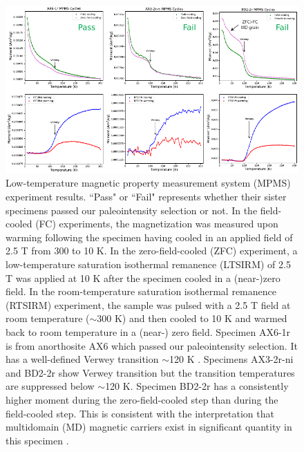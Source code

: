 \documentclass[9pt,twoside]{pnas-new}
\begin{document}
\clearpage

\begin{figure}
\noindent\includegraphics[width=\textwidth]{MPMS.pdf}
\centering
\caption{{Low-temperature magnetic property measurement system (MPMS) experiment results. ``Pass" or ``Fail" represents whether their sister specimens passed our paleointensity selection or not. In the field-cooled (FC) experiments, the magnetization was measured upon warming following the specimen having cooled in an applied field of 2.5 T from 300 to 10 K. In the zero-field-cooled (ZFC) experiment, a low-temperature saturation isothermal remanence (LTSIRM) of 2.5 T was applied at 10 K after the specimen cooled in a (near-)zero field. In the room-temperature saturation isothermal remanence (RTSIRM) experiment, the sample was pulsed with a 2.5 T field at room temperature ($\sim$300 K) and then cooled to 10 K and warmed back to room temperature in a (near-) zero field. Specimen AX6-1r is from anorthosite AX6 which passed our paleointensity selection. It has a well-defined Verwey transition $\sim$120 K \cite{Verwey1939a}. Specimens AX3-2r-ni and BD2-2r show Verwey transition but the transition temperatures are suppressed below $\sim$120 K. Specimen BD2-2r has a consistently higher moment during the zero-field-cooled step than during the field-cooled step. This is consistent with the interpretation that multidomain (MD) magnetic carriers exist in significant quantity in this specimen \cite{Carter-Stiglitz2006a}.}}
\label{fig:MPMS}
\end{figure}

\clearpage
\end{document}
